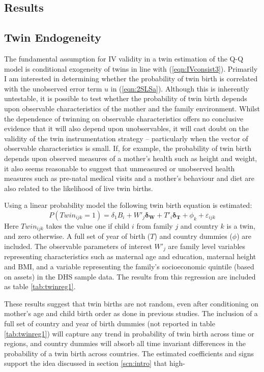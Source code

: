 \documentclass{article}[11pt,subeqn]
\newcommand{\vect}[1]{\mathbf{#1}}
\begin{document}
\begin{spacing}{1.5}
\section{Results}
\label{scn:results}
\subsection{Twin Endogeneity}
\label{scn:twinendog}
The fundamental assumption for IV validity in a twin estimation of the Q-Q model is conditional exogeneity of twins in line with (\ref{eqn:IVconsist3}).
Primarily I am interested in determining whether the probability of twin birth is correlated with the unobserved error term $u$ in (\ref{eqn:2SLSa}).  
Although this is inherently untestable, it is possible to test whether the probability of twin birth depends upon observable characteristics of the mother 
and the family environment.  Whilst the dependence of twinning on observable characteristics offers no conclusive evidence that it will also 
depend upon unobservables, it will cast doubt on the validity of the twin instrumentation strategy -- particularly when the vector of observable 
characteristics is small.  If, for example, the probability of twin birth depends upon observed measures of a mother's health such as height and weight, 
it also seems reasonable to suggest that unmeasured or unobserved health measures such as pre-natal medical visits and a mother's behaviour and diet
are also related to the likelihood of live twin births. 
 
Using a linear probability model the following twin birth equation is estimated: 
\begin{equation}
\label{eqn:twinpred}
P(Twin_{ijk}=1)=\delta_1 B_i + W'_j\vect{\delta_\vect{W}}+ T'_{i}\vect{\delta_\vect{T}} +  \phi_k + \varepsilon_{ijk}
\end{equation}
Here $Twin_{ijk}$ takes the value one if child $i$ from family $j$ and country $k$ is a twin, and zero otherwise.  A full set of year of birth ($T$) and country
dummies ($\phi$) are included.  The observable parameters of interest $W'_j$ are family level variables representing characteristics such as maternal age and
education, maternal height and BMI, and a variable representing the family's socioeconomic quintile (based on assets) in the DHS sample data. The results from this 
regression are included as table \ref{tab:twinreg1}.

These results suggest that twin births are not random, even after conditioning on mother's age and child birth order as done in previous studies.  The
inclusion of a full set of country and year of birth dummies (not reported in table \ref{tab:twinreg1}) will capture any trend in
probability of twin birth across time or regions, and country dummies will absorb all time invariant differences in the probability of a twin birth across countries.  
The estimated coefficients and signs support the idea discussed in section \ref{scn:intro} that high-


\end{spacing}
\end{document}
